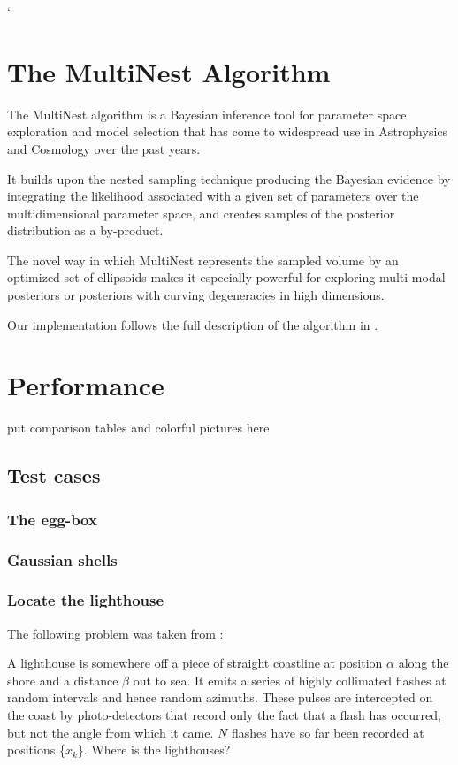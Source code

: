 `\documentclass{article}
\begin{document}
\section{The MultiNest Algorithm}
The MultiNest algorithm is a Bayesian inference tool for parameter space exploration and model selection that has come to widespread use in Astrophysics and Cosmology over the past years. 

It builds upon the nested sampling technique producing the Bayesian evidence by integrating the likelihood associated with a given set of parameters over the multidimensional parameter space, and creates samples of the posterior distribution as a by-product.

The novel way in which MultiNest represents the sampled volume by an optimized set of ellipsoids makes it especially powerful for exploring multi-modal posteriors or posteriors with curving degeneracies in high dimensions.

Our implementation follows the full description of the algorithm in \cite{2009MNRAS.398.1601F}.
\section{Performance}
put comparison tables and colorful pictures here

\subsection{Test cases}

\subsubsection{The egg-box}

\subsubsection{Gaussian shells}

\subsubsection{Locate the lighthouse}

The following problem was taken from \cite{Siv2006}:

\vspace{0.2cm}

\begin{adjustwidth*}{1.2cm}{2.cm}
A lighthouse is somewhere off a piece of straight coastline at position $\alpha$ along the shore and a distance $\beta$ out to sea. It emits a series of highly collimated flashes at random intervals and hence random azimuths. These pulses are intercepted on the coast by photo-detectors that record only the fact that a flash has occurred, but not the angle from which it came. $N$ flashes have so far been recorded at positions \{$x_k$\}. Where is the lighthouses?
 \end{adjustwidth*}
 
\end{document}
